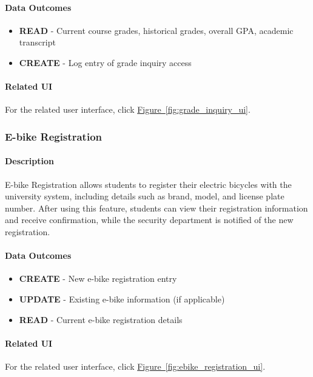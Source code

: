 \documentclass[12pt]{article}
\begin{document}
\paragraph{Data Outcomes}
\begin{itemize}
    \item \textbf{READ} - Current course grades, historical grades, overall GPA, academic transcript
    \item \textbf{CREATE} - Log entry of grade inquiry access
\end{itemize}

\paragraph{Related UI}
For the related user interface, click \hyperref[fig:grade_inquiry_ui]{Figure~\ref*{fig:grade_inquiry_ui}}.

\subsubsection{E-bike Registration}

\paragraph{Description}
E-bike Registration allows students to register their electric bicycles with the university system, including details such as brand, model, and license plate number. After using this feature, students can view their registration information and receive confirmation, while the security department is notified of the new registration.

\paragraph{Data Outcomes}
\begin{itemize}
    \item \textbf{CREATE} - New e-bike registration entry
    \item \textbf{UPDATE} - Existing e-bike information (if applicable)
    \item \textbf{READ} - Current e-bike registration details
\end{itemize}

\paragraph{Related UI}
For the related user interface, click \hyperref[fig:ebike_registration_ui]{Figure~\ref*{fig:ebike_registration_ui}}.
\end{document}

